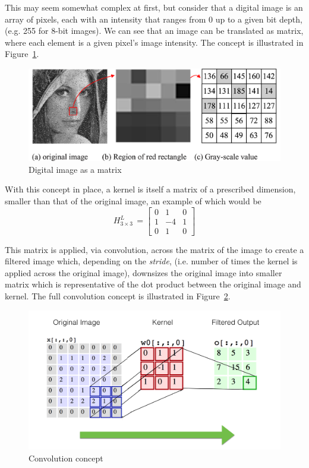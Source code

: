 \documentclass[letterpaper,12pt]{article}
\newcommand{\figref}[1]{Figure~\ref{#1}}
\begin{document}
This may seem somewhat complex at first, but consider that a digital image is an array of pixels, each with an intensity that ranges from 0 up to a given bit depth, (e.g. 255 for 8-bit images). We can see that an image can be translated as matrix, where each element is a given pixel's image intensity. The concept is illustrated in \figref{lena}.
\begin{figure}[htbp]
\begin{center}
\includegraphics[scale=0.1]{images/lena.png}
\caption{Digital image as a matrix \cite{lena}}
\label{lena}
\end{center}
\end{figure}

With this concept in place, a kernel is itself a matrix of a prescribed dimension, smaller than that of the original image,  an example of which would be
\begin{equation}
H_{3 \times 3}^L \, = 
\begin{bmatrix}
  0 & 1  & 0 \\
  1 & -4 & 1 \\
  0 & 1  & 0
\end{bmatrix}
\label{lap_3x3}
\end{equation}

This matrix is applied, via convolution, across the matrix of the image to create a filtered image which, depending on the \textit{stride}, (i.e. number of times the kernel is applied across the original image), downsizes the original image into smaller matrix which is representative of the dot product between the original image and kernel.  The full convolution concept is illustrated in \figref{conv}. 

\begin{figure}[htbp]
\begin{center}
\includegraphics[scale=0.7]{images/convolution.png}
\caption{Convolution concept \cite{cs231}}
\label{conv}
\end{center}
\end{figure}
\end{document}
